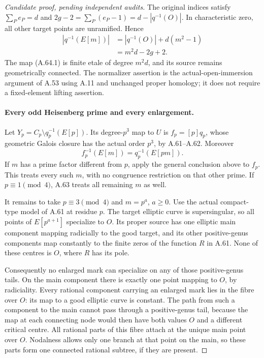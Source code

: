 \begin{proof}[Candidate proof, pending independent audits]
The original indices satisfy
\(\sum_P e_P=d\) and
\(2g-2=\sum_P(e_P-1)=d-|q^{-1}(O)|\).
In characteristic zero, all other target
points are unramified. Hence
\[
 \begin{split}
 |q^{-1}(E[m])|
   &=|q^{-1}(O)|+d(m^2-1)\\
   &=m^2d-2g+2.
 \end{split}                                            \tag{A.64.6}
\]
The map (A.64.1) is finite etale of degree
\(m^2d\), and its source remains geometrically
connected. The normalizer assertion is the
actual-open-immersion argument of A.53 using
A.11 and unchanged proper homology; it does
not require a fixed-element lifting assertion.

\paragraph{Every odd Heisenberg prime and every enlargement.}
Let \(Y_p=C_p\setminus q_p^{-1}(E[p])\).
Its degree-\(p^3\) map to \(U\) is
\(f_p=[p]q_p\), whose geometric Galois closure
has the actual order \(p^3\), by A.61--A.62.
Moreover
\[
                   f_p^{-1}(E[m])=q_p^{-1}(E[pm]).       \tag{A.64.7}
\]
If \(m\) has a prime factor different from
\(p\), apply the general conclusion above to
\(f_p\). This treats every such \(m\), with
no congruence restriction on that other prime.
If \(p\equiv1\pmod4\), A.63 treats all
remaining \(m\) as well.

It remains to take \(p\equiv3\pmod4\) and
\(m=p^a\), \(a\ge0\). Use the actual
compact-type model of A.61 at residue \(p\).
The target elliptic curve is supersingular,
so all points of \(E[p^{a+1}]\) specialize to
\(O\). Its proper source has one elliptic
main component mapping radicially to the
good target, and its other positive-genus
components map constantly to the finite
zeros of the function \(R\) in A.61.
None of these centres is \(O\), where
\(R\) has its pole.

Consequently no enlarged mark can specialize
on any of those positive-genus tails. On the
main component there is exactly one point
mapping to \(O\), by radiciality. Every
rational component carrying an enlarged
mark lies in the fibre over \(O\): its map
to a good elliptic curve is constant. The
path from such a component to the main
cannot pass through a positive-genus tail,
because the map at each connecting node
would then have both values \(O\) and a
different critical centre. All rational
parts of this fibre attach at the unique
main point over \(O\). Nodalness allows
only one branch at that point on the main,
so these parts form one connected rational
subtree, if they are present.


\end{proof}
